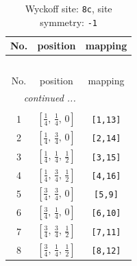 \documentclass[fleqn,8pt]{jsarticle}
\begin{document}
\renewcommand{\arraystretch}{1.2}
\begin{longtable}{ccc}
\caption{Wyckoff site: {\tt 8c}, site symmetry: {\tt -1}}
 \\
 \hline \hline
No. & position & mapping \\ \hline \endfirsthead

\multicolumn{2}{l}{\tablename\ \thetable{}} \\
 \hline \hline
No. & position & mapping \\ \hline \endhead

 \hline \hline
\multicolumn{2}{r}{\footnotesize\it continued ...} \\ \endfoot

 \hline \hline
\multicolumn{2}{r}{} \\ \endlastfoot

1 & $\left[ \frac{1}{4},\, \frac{1}{4},\, 0 \right]$ & {\tt [1,13]} \\ \hline
2 & $\left[ \frac{1}{4},\, \frac{3}{4},\, 0 \right]$ & {\tt [2,14]} \\ \hline
3 & $\left[ \frac{1}{4},\, \frac{1}{4},\, \frac{1}{2} \right]$ & {\tt [3,15]} \\ \hline
4 & $\left[ \frac{1}{4},\, \frac{3}{4},\, \frac{1}{2} \right]$ & {\tt [4,16]} \\ \hline
5 & $\left[ \frac{3}{4},\, \frac{3}{4},\, 0 \right]$ & {\tt [5,9]} \\ \hline
6 & $\left[ \frac{3}{4},\, \frac{1}{4},\, 0 \right]$ & {\tt [6,10]} \\ \hline
7 & $\left[ \frac{3}{4},\, \frac{3}{4},\, \frac{1}{2} \right]$ & {\tt [7,11]} \\ \hline
8 & $\left[ \frac{3}{4},\, \frac{1}{4},\, \frac{1}{2} \right]$ & {\tt [8,12]} \\
\end{longtable}
\renewcommand{\arraystretch}{1.2}
\end{document}
